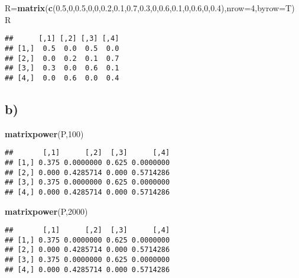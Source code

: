\documentclass[
]{article}
\newenvironment{Shaded}{\begin{snugshade}}{\end{snugshade}}
\newcommand{\AttributeTok}[1]{\textcolor[rgb]{0.13,0.29,0.53}{#1}}
\newcommand{\DecValTok}[1]{\textcolor[rgb]{0.00,0.00,0.81}{#1}}
\newcommand{\FloatTok}[1]{\textcolor[rgb]{0.00,0.00,0.81}{#1}}
\newcommand{\FunctionTok}[1]{\textcolor[rgb]{0.13,0.29,0.53}{\textbf{#1}}}
\newcommand{\NormalTok}[1]{#1}
\newcommand{\OtherTok}[1]{\textcolor[rgb]{0.56,0.35,0.01}{#1}}
\begin{document}
\begin{Shaded}
\begin{Highlighting}[]
\NormalTok{R}\OtherTok{=}\FunctionTok{matrix}\NormalTok{(}\FunctionTok{c}\NormalTok{(}\FloatTok{0.5}\NormalTok{,}\DecValTok{0}\NormalTok{,}\FloatTok{0.5}\NormalTok{,}\DecValTok{0}\NormalTok{,}\DecValTok{0}\NormalTok{,}\FloatTok{0.2}\NormalTok{,}\FloatTok{0.1}\NormalTok{,}\FloatTok{0.7}\NormalTok{,}\FloatTok{0.3}\NormalTok{,}\DecValTok{0}\NormalTok{,}\FloatTok{0.6}\NormalTok{,}\FloatTok{0.1}\NormalTok{,}\DecValTok{0}\NormalTok{,}\FloatTok{0.6}\NormalTok{,}\DecValTok{0}\NormalTok{,}\FloatTok{0.4}\NormalTok{),}\AttributeTok{nrow=}\DecValTok{4}\NormalTok{,}\AttributeTok{byrow=}\NormalTok{T)}
\NormalTok{R}
\end{Highlighting}
\end{Shaded}

\begin{verbatim}
##      [,1] [,2] [,3] [,4]
## [1,]  0.5  0.0  0.5  0.0
## [2,]  0.0  0.2  0.1  0.7
## [3,]  0.3  0.0  0.6  0.1
## [4,]  0.0  0.6  0.0  0.4
\end{verbatim}

\hypertarget{b}{%
\subsection{b)}\label{b}}

\begin{Shaded}
\begin{Highlighting}[]
\FunctionTok{matrixpower}\NormalTok{(P,}\DecValTok{100}\NormalTok{)}
\end{Highlighting}
\end{Shaded}

\begin{verbatim}
##       [,1]      [,2]  [,3]      [,4]
## [1,] 0.375 0.0000000 0.625 0.0000000
## [2,] 0.000 0.4285714 0.000 0.5714286
## [3,] 0.375 0.0000000 0.625 0.0000000
## [4,] 0.000 0.4285714 0.000 0.5714286
\end{verbatim}

\begin{Shaded}
\begin{Highlighting}[]
\FunctionTok{matrixpower}\NormalTok{(P,}\DecValTok{2000}\NormalTok{)}
\end{Highlighting}
\end{Shaded}

\begin{verbatim}
##       [,1]      [,2]  [,3]      [,4]
## [1,] 0.375 0.0000000 0.625 0.0000000
## [2,] 0.000 0.4285714 0.000 0.5714286
## [3,] 0.375 0.0000000 0.625 0.0000000
## [4,] 0.000 0.4285714 0.000 0.5714286
\end{verbatim}
\end{document}
